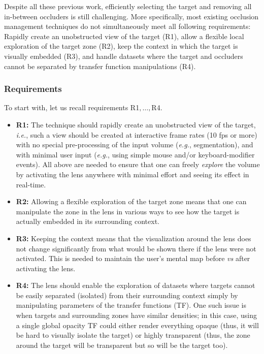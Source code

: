 Despite all these previous work, efficiently selecting the target and removing all in-between occluders is still challenging. More specifically, most existing occlusion management techniques do not simultaneously meet all following requirements: Rapidly create an unobstructed view of the target (R1), allow a flexible local exploration of the target zone (R2), keep the context in which the target is visually embedded (R3), and handle datasets where the target and occluders cannot 
be separated by transfer function manipulations (R4).

\subsubsection{Requirements}

To start with, let us recall requirements R1$,\ldots,$R4.
\begin{itemize}
\item{\textbf{R1:}} The technique should rapidly create an unobstructed view of the target, \emph{i.e.}, such a view should be created at interactive frame rates (10 fps or more) with no special pre-processing of the input volume (\emph{e.g.}, segmentation), and with minimal user input (\emph{e.g.}, using simple mouse and/or keyboard-modifier events). All above are needed to ensure that one can freely \emph{explore} the volume by activating the lens anywhere with minimal effort and seeing its effect in real-time.

\item{\textbf{R2:}} Allowing a flexible exploration of the target zone means that one can manipulate the zone in the lens in various ways to see how the target is actually embedded in its surrounding context.

\item{\textbf{R3:}} Keeping the context means that the visualization around the lens does not change significantly from what would be shown there if the lens were not activated. This is needed to maintain the user's mental map before \emph{vs} after activating the lens.

\item{\textbf{R4:}} The lens should enable the exploration of datasets where targets cannot be easily separated (isolated) from their surrounding context simply by manipulating parameters of the transfer functions (TF). One such issue is when targets and surrounding zones have similar densities; in this case, using a single global opacity TF could either render everything opaque (thus, it will be hard to visually isolate the target) or highly transparent (thus, the zone around the target will be transparent but so will be the target too).
\end{itemize}


